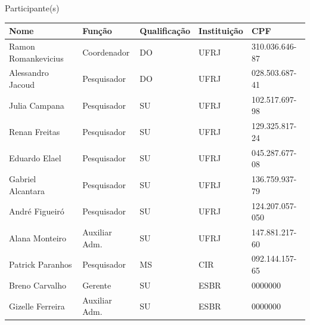 \begin{center}

  
 \vfill



  {\LARGE Participante(s)}
  \vspace{0.50cm}



  \begin{center}
    \begin{tabular}{| l | l | l | l | l |}
    \hline
   	 Nome 					& Função			 & Qualificação 	& Instituição	 & CPF \\ \hline
   	 Ramon Romankevicius 		& Coordenador 	& DO			 & UFRJ 		& 310.036.646-87\\			\hline
   	Alessandro Jacoud 			& Pesquisador 		& DO 			& UFRJ 	& 028.503.687-41\\ 			\hline
   	Julia Campana 			& Pesquisador		 & SU 			& UFRJ 	& 102.517.697-98\\ 			\hline
   	Renan Freitas 				& Pesquisador 		& SU 			& UFRJ 	& 129.325.817-24\\ 		
   	\hline Eduardo Elael 				& Pesquisador 		& SU 			& UFRJ	 & 045.287.677-08\\ 			\hline
  	Gabriel Alcantara 			& Pesquisador 		& SU 			& UFRJ 	& 136.759.937-79\\ 		
  	\hline André Figueiró 			& Pesquisador 		& SU 			& UFRJ 	& 124.207.057-050\\ 			\hline
   	Alana Monteiro 			 & Auxiliar Adm.	 & SU 			& UFRJ 	& 147.881.217-60\\ 		
   	\hline Patrick  Paranhos 			& Pesquisador 		& MS 			& CIR 	& 092.144.157-65\\ \hline
	Breno Carvalho				 & Gerente 		& SU 			& ESBR 	& 0000000\\ 	
\hline
	Gizelle Ferreira 			& Auxiliar Adm. 	& SU 			& ESBR 	& 0000000\\ 
\hline

    
    \hline 
    \end{tabular}
\end{center}






\end{center}

\newpage

\hypersetup{pageanchor=true}

